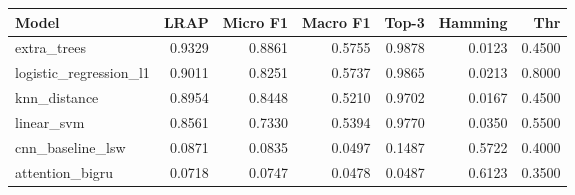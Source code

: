 \begin{tabular}{lrrrrrr}
\toprule
Model & LRAP & Micro F1 & Macro F1 & Top-3 & Hamming & Thr \\
\midrule
extra\_trees & 0.9329 & 0.8861 & 0.5755 & 0.9878 & 0.0123 & 0.4500 \\
logistic\_regression\_l1 & 0.9011 & 0.8251 & 0.5737 & 0.9865 & 0.0213 & 0.8000 \\
knn\_distance & 0.8954 & 0.8448 & 0.5210 & 0.9702 & 0.0167 & 0.4500 \\
linear\_svm & 0.8561 & 0.7330 & 0.5394 & 0.9770 & 0.0350 & 0.5500 \\
cnn\_baseline\_lsw & 0.0871 & 0.0835 & 0.0497 & 0.1487 & 0.5722 & 0.4000 \\
attention\_bigru & 0.0718 & 0.0747 & 0.0478 & 0.0487 & 0.6123 & 0.3500 \\
\bottomrule
\end{tabular}